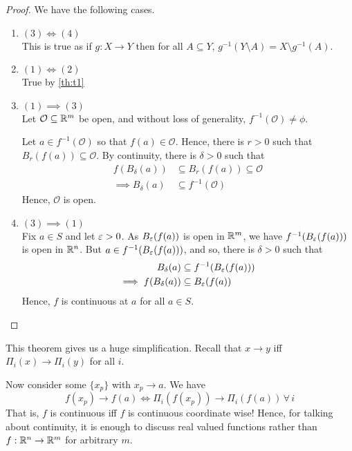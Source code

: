 \documentclass[../Analysis-3.tex]{subfiles}
\begin{document}
\begin{proof} We have the following cases.
  \begin{enumerate}[label = $\bullet$]
    \item $ (3) \iff (4) $\\
          This is true as if $ g: X \to Y $ then for all $ A \subseteq Y $, $ g^{-1}(Y \setminus A) = X \setminus g^{-1}(A) $.
    \item $ (1) \iff (2) $\\
          True by \ref{th:t1}

    \item $ (1) \implies (3) $\\
          Let $ \mathcal O \subseteq \mathbb{R}^m $ be open, and without loss of generality, $ f^{-1}(\mathcal O) \neq \phi $.

          Let $ a \in f^{-1}(\mathcal{O}) $ so that $ f(a) \in \mathcal O $. Hence, there is $ r > 0 $ such that $ B_r(f(a)) \subseteq \mathcal O $. By continuity, there is $ \delta > 0 $ such that
          \begin{align*}
            f(B_\delta(a))       & \subseteq B_r(f(a)) \subseteq \mathcal O \\
            \implies B_\delta(a) & \subseteq f^{-1}(\mathcal{O})
          \end{align*}
          Hence, $ \mathcal O $ is open.

    \item $ (3) \implies (1) $\\
          Fix $ a \in S $ and let $ \varepsilon > 0 $. As $ B_\varepsilon(f(a)) $ is open in $ \mathbb{R}^m $, we have $ f^{-1}(B_\varepsilon(f(a))) $ is open in $ \mathbb{R}^n $. But $ a \in f^{-1}(B_\varepsilon(f(a))) $, and so, there is $ \delta > 0 $ such that
          \begin{align*}
            B_\delta(a)             & \subseteq f^{-1}(B_\varepsilon(f(a))) \\
            \implies f(B_\delta(a)) & \subseteq B_\varepsilon(f(a))
          \end{align*}
          Hence, $ f $ is continuous at $ a $ for all $ a \in S $.
  \end{enumerate}
\end{proof}

This theorem gives us a huge simplification. Recall that $ x \longrightarrow y $ iff $ \Pi_i(x) \longrightarrow \Pi_i(y) $ for all $ i $.

Now consider some $ \{x_p\} $ with $ x_p \longrightarrow a $. We have
\[ f(x_p) \longrightarrow f(a) \iff \Pi_i(f(x_p)) \longrightarrow \Pi_i(f(a)) \, \forall \, i  \]
That is, $ f $ is continuous iff $ f $ is continuous coordinate wise! Hence, for talking about continuity, it is enough to discuss real valued functions rather than $ f: \mathbb{R}^n \to \mathbb{R}^m $ for arbitrary $ m $.
\pagebreak
\end{document}
